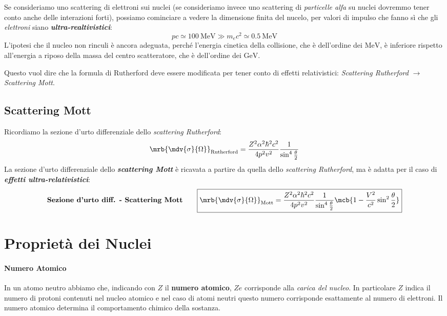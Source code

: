 Se consideriamo uno scattering di elettroni sui nuclei (se consideriamo invece
uno scattering di \textit{particelle alfa} su nuclei dovremmo tener conto anche
delle interazioni forti), possiamo cominciare a vedere la dimensione finita del
nucelo, per valori di impulso che fanno sì che gli \textit{elettroni}
siano \textit{\textbf{ultra-realtivistici}}:
\begin{equation}
  pc \simeq \SI{100}{\MeV} \gg m_e c^2 \simeq \SI{0.5}{\MeV}
\end{equation}
L'ipotesi che il nucleo non rinculi è ancora adeguata, perché l'energia
cinetica della collisione, che è dell'ordine dei $\si{\MeV}$, è inferiore
rispetto all'energia a riposo della massa del centro scatteratore, che è
dell'ordine dei $\si{\GeV}$.

Questo vuol dire che la formula di Rutherford deve essere modificata per tener
conto di effetti relativistici: \textit{Scattering Rutherford} $\rightarrow$
\textit{Scattering Mott}.

\subsection{Scattering Mott}
Ricordiamo la sezione d'urto differenziale dello \textit{scattering
Rutherford}:
\begin{equation}
  \mrb{\mdv{\sigma}{\Omega}}_\text{Rutherford} = \frac{Z^2 \alpha^2 \hbar^2
  c^2}{4 p^2 v^2} \frac{1}{\sin^{4} \frac{\theta}{2}}
\end{equation}
La sezione d'urto differenziale dello \textit{\textbf{scattering Mott}} è
ricavata a partire da quella dello \textit{scattering Rutherford}, ma è adatta
per il caso di \textit{\textbf{effetti ultra-relativistici}}:
\begin{align*}
  \textbf{Sezione d'urto diff. - Scattering Mott}\qquad
  \boxed{
    \mrb{\mdv{\sigma}{\Omega}}_\text{Mott} = \frac{Z^2 \alpha^2 \hbar^2 c^2}{4
    p^2 v^2} \frac{1}{\sin^{4} \frac{\theta}{2}} \mcb{1 - \frac{V^2}{c^2}
    \sin^2 \frac{\theta}{2}}
  }
\end{align*}

\section{Proprietà dei Nuclei}
\paragraph{Numero Atomico}
In un atomo neutro abbiamo che, indicando con $Z$ il \textbf{numero atomico},
$Ze$ corrisponde alla \textit{carica del nucleo}. In particolare $Z$ indica il
numero di protoni contenuti nel nucleo atomico e nel caso di atomi neutri
questo numero corrisponde esattamente al numero di elettroni. Il numero atomico
determina il comportamento chimico della sostanza.

